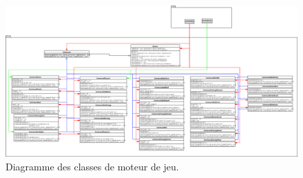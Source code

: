 \begin{landscape}
\begin{figure}[hp]
\includegraphics[width=0.9\paperheight]{images/engine.png}
\caption{\label{uml:engine}Diagramme des classes de moteur de jeu.} 
\end{figure}
\end{landscape}

\newpage
